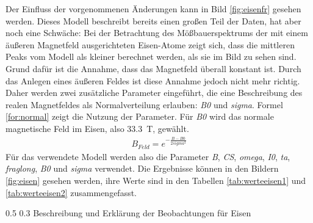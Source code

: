 \documentclass[german, %
parskip=full, %
bibliography=totoc, %
]{scrartcl}
\makeatletter
\renewcommand\subsection{\@startsection 
   {subsection}{2}{0mm}%
   {0.5\baselineskip}%
   {0.3\baselineskip}%
   {\bfseries\sffamily\large}%
   }
\makeatother
\begin{document}
Der Einfluss der vorgenommenen Änderungen kann in Bild \ref{fig:eisenfr} gesehen werden. Dieses Modell beschreibt bereits einen großen Teil der Daten, hat aber noch eine Schwäche: Bei der Betrachtung des Mößbauerspektrums der mit einem äußeren Magnetfeld ausgerichteten Eisen-Atome zeigt sich, dass die mittleren Peaks vom Modell als kleiner berechnet werden, als sie im Bild zu sehen sind. Grund dafür ist die Annahme, dass das Magnetfeld überall konstant ist. Durch das Anlegen eines äußeren Feldes ist diese Annahme jedoch nicht mehr richtig. Daher werden zwei zusätzliche Parameter eingeführt, die eine Beschreibung des realen Magnetfeldes als Normalverteilung erlauben: \textit{B0} und \textit{sigma}. Formel \ref{for:normal} zeigt die Nutzung der Parameter. Für \textit{B0} wird das normale magnetische Feld im Eisen, also \SI{33.3}{\tesla}, gewählt.
\begin{align}
B_{Feld} = e^{-\frac{B-B0}{2sigma^2}} \label{for:normal}
\end{align} 
Für das verwendete Modell werden also die Parameter \textit{B}, \textit{CS}, \textit{omega}, \textit{I0}, \textit{ta}, \textit{fraglong}, \textit{B0} und \textit{sigma} verwendet. Die Ergebnisse können in den Bildern \ref{fig:eisen} gesehen werden, ihre Werte sind in den Tabellen \ref{tab:werteeisen1} und \ref{tab:werteeisen2} zusammengefasst.

\subsection{Beschreibung und Erklärung der Beobachtungen für Eisen}
\end{document}
